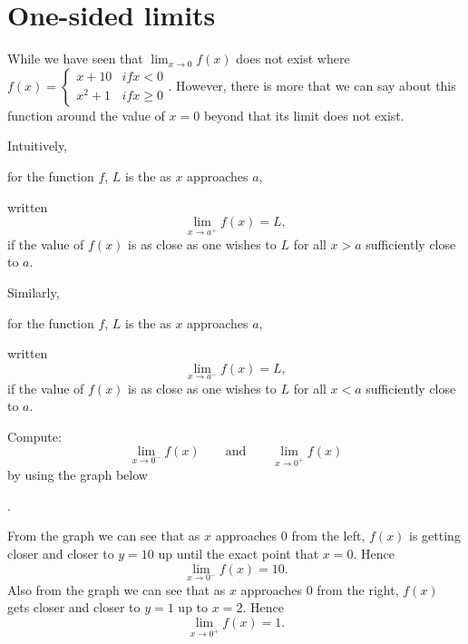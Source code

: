 \documentclass{ximera}
\begin{document}
\section{One-sided limits}


While we have seen that $\lim_{x\to 0}f(x)$ does not
exist where $f(x)=\begin{cases} x+10 & \textit{if}x<0\\x^2+1 & \textit{if} x\geq 0\end{cases}$. However, there is more that we can say about this function around the value of $x=0$ beyond that its limit does not exist.



\begin{definition}
  Intuitively,

   for the function $f$,  $L$ is the  as $x$ approaches $a$,

  written
  \[
  \lim_{x\to a^+} f(x) = L,
  \]
  if the value of $f(x)$ is as close as one wishes to $L$ for
  all $x>a$ sufficiently close to $a$.
  
  Similarly,


   for  the function $f$, $L$ is the  as $x$ approaches $a$,
  

  written
  \[
  \lim_{x\to a^-} f(x) = L,
  \]
  if the value of $f(x)$ is as close as one wishes to $L$ for
  all $x<a$ sufficiently close to $a$.

\end{definition}


\begin{example}
Compute:
\[
\lim_{x\to 0^-} f(x)\qquad\text{and}\qquad \lim_{x\to 0^+} f(x)
\]
by using the graph below
\begin{image}
.
\end{image}
\begin{explanation}
  From the graph we can see that as $x$ approaches $0$ from the left, $f(x)$ is getting closer and closer to $y=10$ up  until the exact point that $x=0$. Hence
  \[
  \lim_{x\to 0^-} f(x)=10.
  \]
  Also from the graph we can see that as $x$ approaches $0$ from the
  right, $f(x)$ gets closer and closer to $y=1$ up to $x=2$. Hence
  \[
  \lim_{x\to 0^+} f(x)=1.
  \]
\end{explanation}
\end{example}
\end{document}
